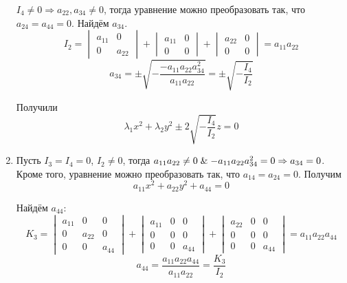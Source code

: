 \begin{enumerate}
	$I_4 \neq 0 \Rightarrow a_{22}, a_{34} \neq 0$, тогда уравнение можно преобразовать так, что $a_{24} = a_{44} = 0$.
	Найдём $a_{34}$.
	\begin{equation*}
	I_2 =
	\begin{vmatrix}
	a_{11} & 0 \\
	0 & a_{22}
	\end{vmatrix} +
	\begin{vmatrix}
	a_{11} & 0 \\
	0 & 0
	\end{vmatrix} +
	\begin{vmatrix}
	a_{22} & 0 \\
	0 & 0
	\end{vmatrix} =
	a_{11} a_{22}
	\end{equation*}
	\begin{equation*}
	a_{34} = \pm\sqrt{-\frac{-a_{11} a_{22} a_{34}^2}{a_{11} a_{22}}} =
	\pm\sqrt{-\frac{I_4}{I_2}}
	\end{equation*}
	
	Получили
	\begin{equation*}
	\lambda_1 x^2 + \lambda_2 y^2 \pm 2\sqrt{-\frac{I_4}{I_2}}z = 0
	\end{equation*}
	
	\item Пусть $I_3 = I_4 = 0$, $I_2 \neq 0$, тогда $a_{11} a_{22} \neq 0 \mathrel{\&} -a_{11} a_{22} a_{34}^2 = 0 \Rightarrow a_{34} = 0$.
	Кроме того, уравнение можно преобразовать так, что $a_{14} = a_{24} = 0$.
	Получим
	\begin{equation*}
	a_{11} x^2 + a_{22} y^2 + a_{44} = 0
	\end{equation*}
	
	Найдём $a_{44}$:
	\begin{equation*}
	K_3 =
	\begin{vmatrix}
	a_{11} & 0 & 0 \\
	0 & a_{22} & 0 \\
	0 & 0 & a_{44}
	\end{vmatrix} +
	\begin{vmatrix}
	a_{11} & 0 & 0 \\
	0 & 0 & 0 \\
	0 & 0 & a_{44}
	\end{vmatrix} +
	\begin{vmatrix}
	a_{22} & 0 & 0 \\
	0 & 0 & 0 \\
	0 & 0 & a_{44}
	\end{vmatrix} = a_{11} a_{22} a_{44}
	\end{equation*}
	\begin{equation*}
	a_{44} = \frac{a_{11} a_{22} a_{44}}{a_{11} a_{22}} =
	\frac{K_3}{I_2}
	\end{equation*}
	

\end{enumerate}
